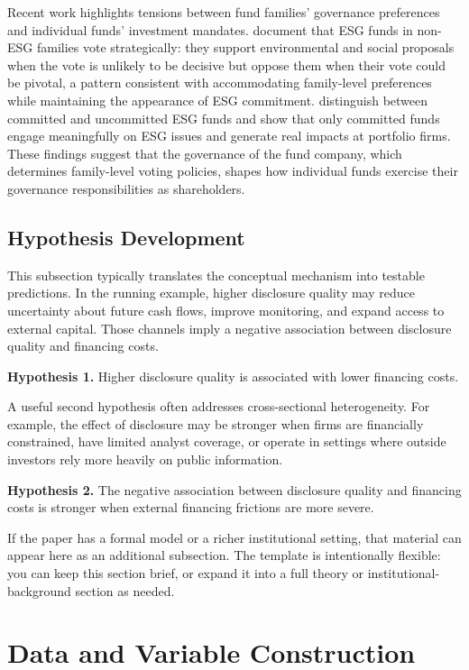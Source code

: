 \documentclass[hidelinks,12pt]{article}
\begin{document}
Recent work highlights tensions between fund families' governance preferences and individual funds' investment mandates. \citet{michaely2024strategic} document that ESG funds in non-ESG families vote strategically: they support environmental and social proposals when the vote is unlikely to be decisive but oppose them when their vote could be pivotal, a pattern consistent with accommodating family-level preferences while maintaining the appearance of ESG commitment. \citet{lowry2025esg} distinguish between committed and uncommitted ESG funds and show that only committed funds engage meaningfully on ESG issues and generate real impacts at portfolio firms. These findings suggest that the governance of the fund company, which determines family-level voting policies, shapes how individual funds exercise their governance responsibilities as shareholders.

\subsection{Hypothesis Development}

This subsection typically translates the conceptual mechanism into testable predictions. In the running example, higher disclosure quality may reduce uncertainty about future cash flows, improve monitoring, and expand access to external capital. Those channels imply a negative association between disclosure quality and financing costs.

\noindent \textbf{Hypothesis 1.} Higher disclosure quality is associated with lower financing costs.

A useful second hypothesis often addresses cross-sectional heterogeneity. For example, the effect of disclosure may be stronger when firms are financially constrained, have limited analyst coverage, or operate in settings where outside investors rely more heavily on public information.

\noindent \textbf{Hypothesis 2.} The negative association between disclosure quality and financing costs is stronger when external financing frictions are more severe.

If the paper has a formal model or a richer institutional setting, that material can appear here as an additional subsection. The template is intentionally flexible: you can keep this section brief, or expand it into a full theory or institutional-background section as needed.

\section{Data and Variable Construction}
\label{sec:data}
\end{document}
